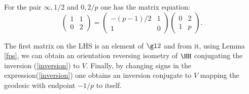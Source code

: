 
% 
 






For the pair $\infty, 1/2$  and  $0, 2/p$   one has the matrix equation:
\begin{equation}
\begin{pmatrix}
1 & 1\\
0 & 2
\end{pmatrix}
= 
\begin{pmatrix}
 -(p-1)/2& 1\\
1 & 0
\end{pmatrix}
\begin{pmatrix}
0& 2\\
1 & p
\end{pmatrix}.
\end{equation}


The first matrix on the LHS is an element of $\gl2$
and from it, using Lemma \ref{fps}, we can obtain an orientation reversing isometry of
$\HH$ conjugating the inversion (\ref{inversion}) to $V$.
Finally, by changing signs in the expression(\ref{inversion})  one obtains an inversion 
conjugate to $V$ mapping the geodesic with endpoint $-1/p$ to itself.

